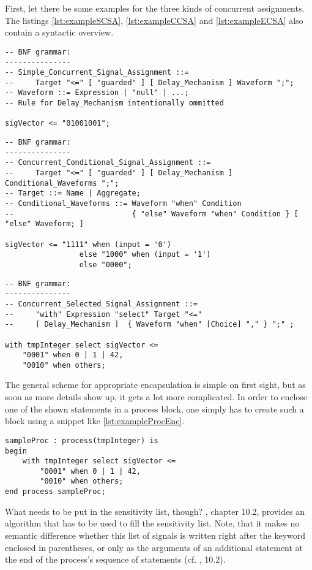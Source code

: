 First, let there be some examples for the three kinds of concurrent
assignments. The listings \ref{lst:exampleSCSA}, \ref{lst:exampleCCSA}
and \ref{lst:exampleECSA} also contain a syntactic overview.
%
\begin{lstlisting}[style=vhdl,caption={Simple concurrent signal
      assignment},label={lst:exampleSCSA}]
-- BNF grammar:
---------------
-- Simple_Concurrent_Signal_Assignment ::=
--     Target "<=" [ "guarded" ] [ Delay_Mechanism ] Waveform ";";
-- Waveform ::= Expression | "null" | ...;
-- Rule for Delay_Mechanism intentionally ommitted

sigVector <= "01001001";
\end{lstlisting}
%
\begin{lstlisting}[style=vhdl,caption={Conditional concurrent signal
      assignment}, label={lst:exampleCCSA}]
-- BNF grammar:
---------------
-- Concurrent_Conditional_Signal_Assignment ::=
--     Target "<=" [ "guarded" ] [ Delay_Mechanism ] Conditional_Waveforms ";";
-- Target ::= Name | Aggregate;
-- Conditional_Waveforms ::= Waveform "when" Condition
--                           { "else" Waveform "when" Condition } [ "else" Waveform; ]

sigVector <= "1111" when (input = '0')
                 else "1000" when (input = '1')
                 else "0000";
\end{lstlisting}
%
\begin{lstlisting}[style=vhdl,caption={Selected concurrent signal
      assignment}, label={lst:exampleECSA}]
-- BNF grammar:
---------------
-- Concurrent_Selected_Signal_Assignment ::=
--     "with" Expression "select" Target "<="
--     [ Delay_Mechanism ]  { Waveform "when" [Choice] "," } ";" ;

with tmpInteger select sigVector <=
    "0001" when 0 | 1 | 42,
    "0010" when others;

\end{lstlisting}
%
The general scheme for appropriate encapsulation is simple on first
sight, but as soon as more details show up, it gets a lot more
complicated. In order to enclose one of the shown statements in a
process block, one simply has to create such a block using a snippet
like \ref{lst:exampleProcEnc}.
%
\begin{lstlisting}[style=vhdl,caption={Process encapsulation},
    label={lst:exampleProcEnc}]
sampleProc : process(tmpInteger) is
begin
    with tmpInteger select sigVector <=
        "0001" when 0 | 1 | 42,
        "0010" when others;
end process sampleProc;
\end{lstlisting}
%
What needs to be put in the sensitivity list, though? \cite{IEEELRM},
chapter 10.2,
provides an algorithm that has to be used to fill the sensitivity
list. Note, that it makes no semantic difference whether this
list of signals is written right after the  keyword
enclosed in parentheses, or only as the arguments of an additional
 statement at the end of the process's sequence of
statements (cf. \cite{IEEELRM}, 10.2).

